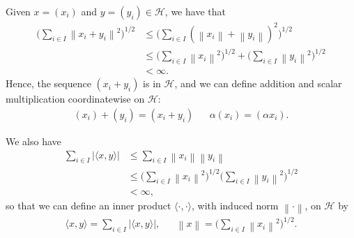 \documentclass[11pt,a4paper]{report}
\theoremstyle{plain}
\theoremstyle{definition}
\newcommand{\1}{\mathbbm{1}}
\renewcommand{\H}{\mathcal{H}}
\begin{document}
Given $x=(x_i)$ and $y=(y_i)\in\H$, we have that
\begin{align*}
			\Big(\sum_{i\in I}{\left\|x_i+y_i\right\|^2}\Big)^{1/2}
	&\leq	\Big(\sum_{i\in I}{(\left\|x_i\right\|+\left\|y_i\right\|)^2}\Big)^{1/2}		\\
	&\leq	\Big(\sum_{i\in I}{\left\|x_i\right\|^2}\Big)^{1/2}		+
						\Big(\sum_{i\in I}{\left\|y_i\right\|^2}\Big)^{1/2}					\\
	&< 		\infty.
\end{align*}
Hence, the sequence $(x_i+y_i)$ is in $\H$, and we can define addition and 
scalar multiplication coordinatewise on $\H$:
\begin{align*}
	(x_i)+(y_i)=(x_i+y_i) && \alpha(x_i) = (\alpha x_i).
\end{align*}

We also have
\begin{align*}
			\sum_{i\in I}{\left|\langle x,y\rangle\right|} 
	&\leq	\sum_{i\in I}{\left\|x_i\right\|	\left\|y_i\right\|}							\\
	&\leq 	\Big(\sum_{i\in I}{\left\|x_i\right\|^2}\Big)^{1/2}
							\Big(\sum_{i\in I}{\left\|y_i\right\|^2}\Big)^{1/2}				\\
	&< \infty,
\end{align*}
so that we can define an inner product $\langle\cdot,\cdot\rangle$, with induced 
norm $\left\|\cdot\right\|$, on $\H$ by
\begin{align*}
	\langle x,y\rangle = \sum_{i\in I}{\left|\langle x,y\rangle\right|}, 
			&& \left\|x\right\| = \Big(\sum_{i\in I}{\left\|x_i\right\|^2}\Big)^{1/2}.
\end{align*}
\end{document}
